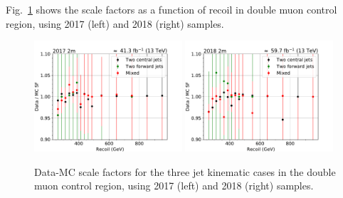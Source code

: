 Fig.~\ref{fig:sf_recoil_2m} shows the scale factors as a function of recoil in double muon control region, using 2017 (left)
and 2018 (right) samples.

\begin{figure}[hbp]
    \begin{center}
        \includegraphics[width=0.49\textwidth]{fig/efficiency/trigger/met/recoil/scale_factors_2m_2017.pdf}
        \includegraphics[width=0.49\textwidth]{fig/efficiency/trigger/met/recoil/scale_factors_2m_2018.pdf}
    \end{center}
    \caption{Data-MC scale factors for the three jet kinematic cases in the double muon control region, using 2017 (left) and 2018 (right) samples.}
    \label{fig:sf_recoil_2m}
\end{figure}

